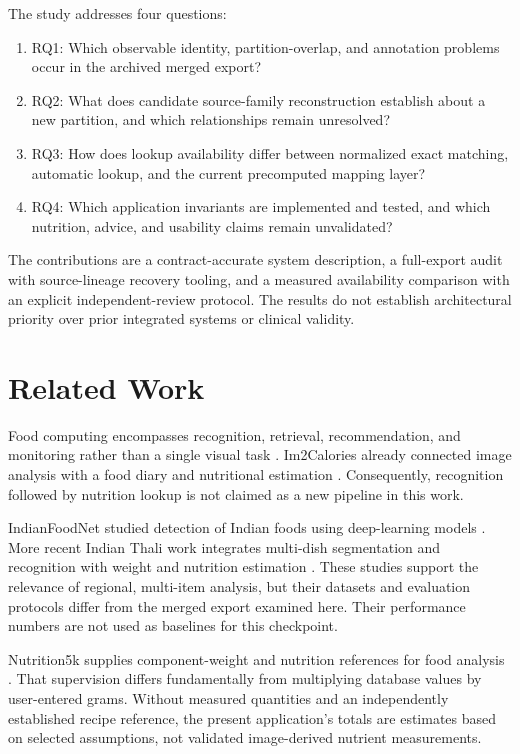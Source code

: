 \documentclass[12pt,journal,draftclsnofoot,onecolumn]{IEEEtran}
\begin{document}
The study addresses four questions:
\begin{enumerate}
\item RQ1: Which observable identity, partition-overlap, and annotation problems occur in the archived merged export?
\item RQ2: What does candidate source-family reconstruction establish about a new partition, and which relationships remain unresolved?
\item RQ3: How does lookup availability differ between normalized exact matching, automatic lookup, and the current precomputed mapping layer?
\item RQ4: Which application invariants are implemented and tested, and which nutrition, advice, and usability claims remain unvalidated?
\end{enumerate}
The contributions are a contract-accurate system description, a full-export audit with source-lineage recovery tooling, and a measured availability comparison with an explicit independent-review protocol. The results do not establish architectural priority over prior integrated systems or clinical validity.

\section{Related Work}
Food computing encompasses recognition, retrieval, recommendation, and monitoring rather than a single visual task \cite{min2019food}. Im2Calories already connected image analysis with a food diary and nutritional estimation \cite{meyers2015im2calories}. Consequently, recognition followed by nutrition lookup is not claimed as a new pipeline in this work.

IndianFoodNet studied detection of Indian foods using deep-learning models \cite{indianfoodnet_2023}. More recent Indian Thali work integrates multi-dish segmentation and recognition with weight and nutrition estimation \cite{indian_thali_2025}. These studies support the relevance of regional, multi-item analysis, but their datasets and evaluation protocols differ from the merged export examined here. Their performance numbers are not used as baselines for this checkpoint.

Nutrition5k supplies component-weight and nutrition references for food analysis \cite{thames2021nutrition5k}. That supervision differs fundamentally from multiplying database values by user-entered grams. Without measured quantities and an independently established recipe reference, the present application's totals are estimates based on selected assumptions, not validated image-derived nutrient measurements.
\end{document}
